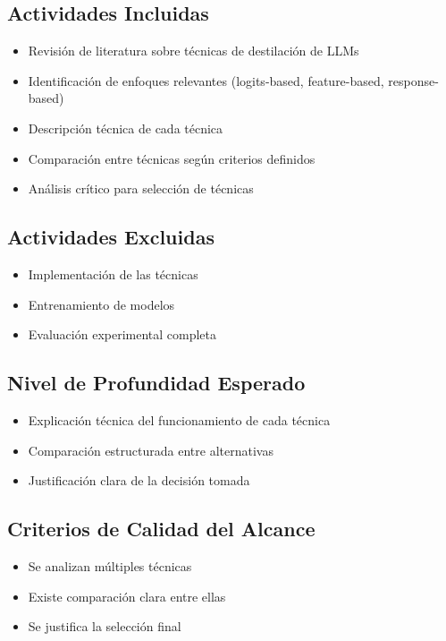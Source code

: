 \documentclass[12pt]{article}
\begin{document}
	\subsection{Actividades Incluidas}
	\begin{itemize}
		\item Revisión de literatura sobre técnicas de destilación de LLMs
		\item Identificación de enfoques relevantes (logits-based, feature-based, response-based)
		\item Descripción técnica de cada técnica
		\item Comparación entre técnicas según criterios definidos
		\item Análisis crítico para selección de técnicas
	\end{itemize}
	
	\subsection{Actividades Excluidas}
	\begin{itemize}
		\item Implementación de las técnicas
		\item Entrenamiento de modelos
		\item Evaluación experimental completa
	\end{itemize}
	
	\subsection{Nivel de Profundidad Esperado}
	\begin{itemize}
		\item Explicación técnica del funcionamiento de cada técnica
		\item Comparación estructurada entre alternativas
		\item Justificación clara de la decisión tomada
	\end{itemize}
	
	\subsection{Criterios de Calidad del Alcance}
	\begin{itemize}
		\item Se analizan múltiples técnicas
		\item Existe comparación clara entre ellas
		\item Se justifica la selección final
	\end{itemize}
	
\end{document}
